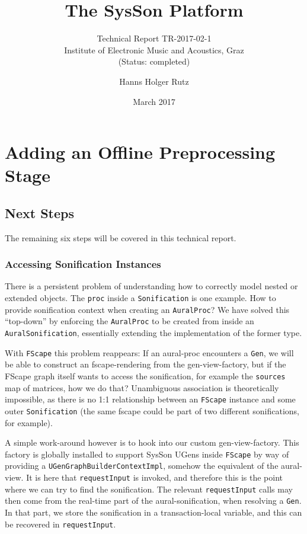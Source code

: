 \documentclass[11pt,a4paper]{article}
\title{The SysSon Platform}
\subtitle{Technical Report TR-2017-02-1\\Institute of Electronic Music and Acoustics, Graz\\(Status: completed)}
\author{Hanns Holger Rutz}
\date{March 2017}
\begin{document}
\maketitle
{}
\thispagestyle{empty}
\newpage
\section{Adding an Offline Preprocessing Stage}

\subsection{Next Steps}

The remaining six steps will be covered in this technical report.

\subsubsection{Accessing Sonification Instances}

There is a persistent problem of understanding how to correctly model nested or extended objects. The \Verb!proc! inside a \Verb!Sonification! is one example. How to provide sonification context when creating an \Verb!AuralProc!? We have solved this ``top-down'' by enforcing the \Verb!AuralProc! to be created from inside an \Verb!AuralSonification!, essentially extending the implementation of the former type.

With \Verb!FScape! this problem reappears: If an aural-proc encounters a \Verb!Gen!, we will be able to construct an fscape-rendering from the gen-view-factory, but if the FScape graph itself wants to access the sonification, for example the \Verb!sources! map of matrices, how we do that? Unambiguous association is theoretically impossible, as there is no 1:1 relationship between an \Verb!FScape! instance and some outer \Verb!Sonification! (the same fscape could be part of two different sonifications, for example).

A simple work-around however is to hook into our custom gen-view-factory. This factory is globally installed to support SysSon UGens inside \Verb!FScape! by way of providing a \Verb!UGenGraphBuilderContextImpl!, somehow the equivalent of the aural-view. It is here that \Verb!requestInput! is invoked, and therefore this is the point where we can try to find the sonification. The relevant \Verb!requestInput! calls may then come from the real-time part of the aural-sonification, when resolving a \Verb!Gen!. In that part, we store the sonification in a transaction-local variable, and this can be recovered in \Verb!requestInput!.
\end{document}
